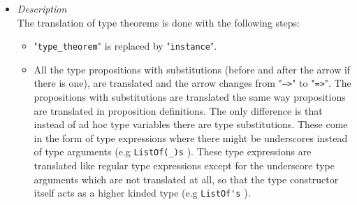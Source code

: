 \documentclass[diploma]{softlab-thesis}
\def\lra{$\Longrightarrow$\ }
\def\prarr{$\xRightarrow{\text{preprocessing}}$\ }
\begin{document}
\begin{itemize}
\rule{\linewidth}{0.1pt}

\begin{verbatim}
type_theorem (ListOf(_)s)Has_Internal_App
proof
  apply(_)inside(_) =
    (f(_), cases)
      [] => []
      [head, tail = ...] => f(head) + apply(f(_))inside(tail)
\end{verbatim}

\lra

\begin{verbatim}
instance A'Has_Internal_App ListOf's where
  apply'inside' =
    \(f', pA0) ->
    case pA0 of
      [] -> []
      head : tail -> f'(head) !+ apply'inside'((\pA0 -> f'(pA0)), tail)

\end{verbatim}

\newpage

\begin{verbatim}
type_proposition (@A)And(@B)Have_Eq_And_Gr
equivalent (@A)And(@B)Can_Be_Equal, (@A)Can_Be_Greater_Than(@B)

type_theorem (@A)And(@B)Have_Eq_And_Gr --> (@A)Can_Be_Gr_Or_Eq_To(@B)
proof a >= b = a == b | a > b
\end{verbatim}
\prarr
\begin{verbatim}
type_theorem
  [(@A)And(@B)Can_Be_Equal, (@A)Can_Be_Greater_Than(@B)] -->
  (@A)Can_Be_Gr_Or_Eq_To(@B)
proof a >= b = a == b | a > b
# this is a representation of the AST after preprocessing
# not lcases syntax
\end{verbatim}
$\xRightarrow{\text{translation}}$
\begin{verbatim}
instance
  (A'And'Can_Be_Equal b0 b1, A'Can_Be_Greater_Than' b0 b1) =>
  A'Can_Be_Gr_Or_Eq_To' b0 b1
  where
  a !>= b = a !== b !| a !> b
\end{verbatim}

\item
\textit{Description} \\

The translation of type theorems is done with the following steps:

\begin{itemize}

\item
"\texttt{type_theorem}" is replaced by "\texttt{instance}".

\item
All the type propositions with substitutions (before and after the arrow if
there is one), are translated and the arrow changes from "\texttt{-->}" to
"\texttt{=>}". The propositions with substitutions are translated the same way
propositions are translated in proposition definitions. The only difference is
that instead of ad hoc type variables there are type substitutions. These come
in the form of type expressions where there might be underscores instead of
type arguments (e.g \verb|ListOf(_)s| ). These type expressions are translated
like regular type expressions except for the underscore type arguments which
are not translated at all, so that the type constructor itself acts as a higher
kinded type (e.g \verb|ListOf's| ).


\end{itemize}
\end{itemize}
\end{document}
